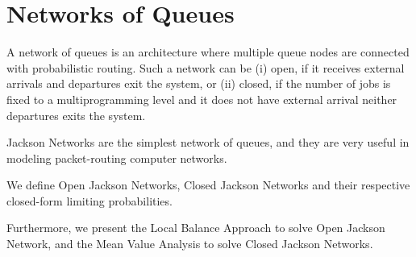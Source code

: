 \section{Networks of Queues}
\label{sec:Networks-Of-Queues}

A network of queues is an architecture where multiple queue nodes are connected with probabilistic routing. Such a network can be 
(i) open, if it receives external arrivals and departures exit the system, or
(ii) closed, if the number of jobs is fixed to a multiprogramming level and it does not have external arrival neither departures exits the system.

Jackson Networks are the simplest network of queues, and they are very useful in modeling packet-routing computer networks.

We define Open Jackson Networks, Closed Jackson Networks and their respective closed-form limiting probabilities.

Furthermore, we present the Local Balance Approach to solve Open Jackson Network, and the Mean Value Analysis to solve Closed Jackson Networks.